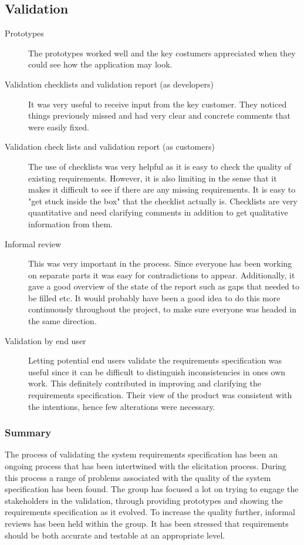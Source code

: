 \documentclass[10pt,a4paper]{article}
\begin{document}
\subsection{Validation}
\begin{description}
\item[Prototypes] The prototypes worked well and the key costumers appreciated when they could see how the application may look.

\item[Validation checklists and validation report (as developers)] It was very useful to receive input from the key customer. They noticed things previously missed and had very clear and concrete comments that were easily fixed. 


\item[Validation check lists and validation report (as customers)] The use of checklists was very helpful as it is easy to check the quality of existing requirements. However, it is also limiting in the sense that it makes it difficult to see if there are any missing requirements. It is easy to "get stuck inside the box" that the checklist actually is. Checklists are very quantitative and need clarifying comments in addition to get qualitative information from them.

\item[Informal review] This was very important in the process. Since everyone has been working on separate parts it was easy for contradictions to appear. Additionally, it gave a good overview of the state of the report such as gaps that needed to be filled etc. It would probably have been a good idea to do this more continuously throughout the project, to make sure everyone was headed in the same direction.

\item[Validation by end user] Letting potential end users validate the requirements specification was useful since it can be difficult to distinguish inconsistencies in ones own work. This definitely contributed in improving and clarifying the requirements specification. Their view of the product was consistent with the intentions, hence few alterations were necessary. 
\end{description}

\subsubsection*{Summary} The process of validating the system requirements specification has been an ongoing process that has been intertwined with the elicitation process. During this process a range of problems associated with the quality of the system specification has been found. The group has focused a lot on trying to engage the stakeholders in the validation, through providing prototypes and showing the requirements specification as it evolved. To increase the quality further, informal reviews has been held within the group. It has been stressed that requirements should be both accurate and testable at an appropriate level.
\end{document}
